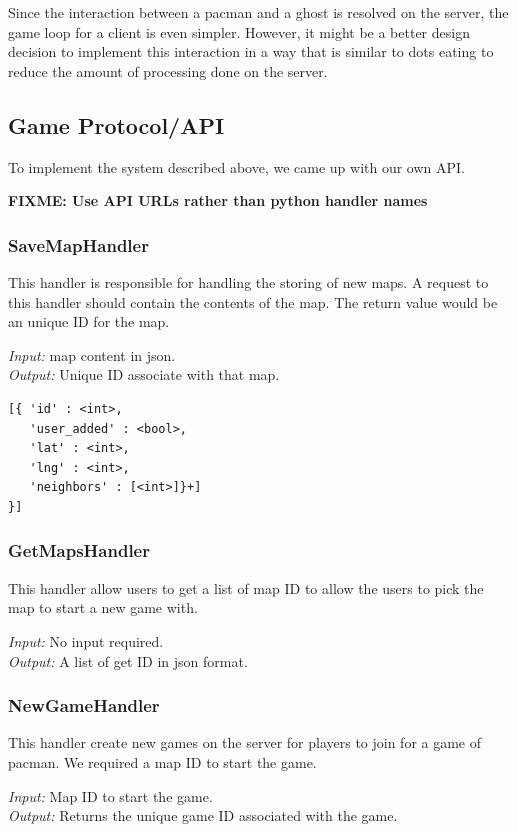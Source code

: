\documentclass{acm_proc_article-sp}
\newcommand{\FIXME}[1]{{\color{red}\textbf{FIXME: #1}}}
\begin{document}
Since the interaction between a pacman and a ghost is resolved on the
server, the game loop for a client is even simpler. However, it might
be a better design decision to implement this interaction in a way
that is similar to dots eating to reduce the amount of processing done
on the server.

\subsection{Game Protocol/API}
To implement the system described above, we came up with our own API.

\FIXME{Use API URLs rather than python handler names}
\subsubsection{SaveMapHandler}
This handler is responsible for handling the storing of new maps. A
request to this handler should contain the contents of the map. The
return value would be an unique ID for the map.

\emph{Input:} map content in json.\\
\emph{Output:} Unique ID associate with that map.

\medskip
\begin{lstlisting}[caption=Map format in json]
[{ 'id' : <int>,
   'user_added' : <bool>,
   'lat' : <int>,
   'lng' : <int>,
   'neighbors' : [<int>]}+]
}]
\end{lstlisting}

\subsubsection{GetMapsHandler}
This handler allow users to get a list of map ID to allow the users to
pick the map to start a new game with.

\emph{Input:} No input required.\\
\emph{Output:} A list of get ID in json format.

\subsubsection{NewGameHandler}\label{newgame}
This handler create new games on the server for players to join for a
game of pacman. We required a map ID to start the game.

\emph{Input:} Map ID to start the game.\\
\emph{Output:} Returns the unique game ID associated with the game.
\end{document}
